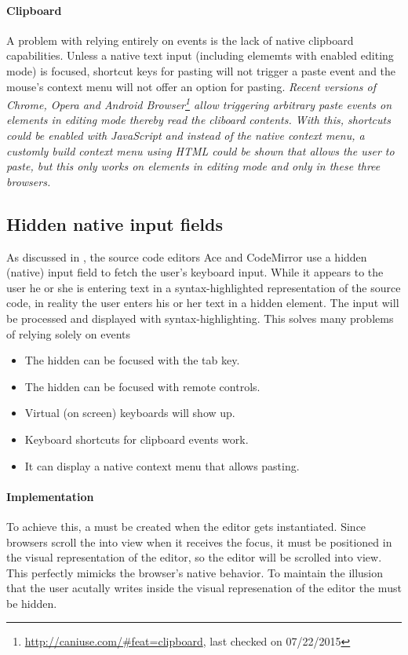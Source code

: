 \paragraph{Clipboard} A problem with relying entirely on events is the lack of native clipboard capabilities. Unless a native text input (including elememts with enabled editing mode) is focused, shortcut keys for pasting will not trigger a paste event and the mouse's context menu will not offer an option for pasting. \textit{Recent versions of Chrome, Opera and Android Browser\footnote{\url{http://caniuse.com/\#feat=clipboard}, last checked on 07/22/2015} allow triggering arbitrary paste events on elements in editing mode thereby read the cliboard contents. With this, shortcuts could be enabled with JavaScript and instead of the native context menu, a customly build context menu using HTML could be shown that allows the user to paste, but this only works on elements in editing mode and only in these three browsers.}

\subsection{Hidden native input fields} 

\label{subsec:hidden_native_input_fields}

As discussed in , the source code editors Ace and CodeMirror use a hidden (native) input field to fetch the user's keyboard input. While it appears to the user he or she is entering text in a syntax-highlighted representation of the source code, in reality the user enters his or her text in a hidden  element. The input will be processed and displayed with syntax-highlighting. This solves many problems of relying solely on events

\begin{itemize}
\item The hidden  can be focused with the tab key.
\item The hidden  can be focused with remote controls.
\item Virtual (on screen) keyboards will show up.
\item Keyboard shortcuts for clipboard events work.
\item It can display a native context menu that allows pasting.
\end{itemize}

\paragraph{Implementation} To achieve this, a  must be created when the editor gets instantiated. Since browsers scroll the  into view when it receives the focus, it must be positioned in the visual representation of the editor, so the editor will be scrolled into view. This perfectly mimicks the browser's native behavior. To maintain the illusion that the user acutally writes inside the visual represenation of the editor the  must be hidden.

